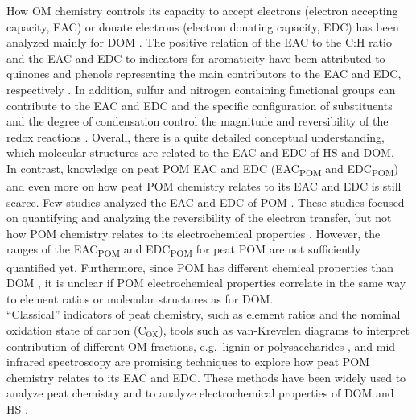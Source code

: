 \documentclass[draft,linenumbers]{agujournal2018}
\begin{document}
How OM chemistry controls its capacity to accept electrons (electron
accepting capacity, EAC) or donate electrons (electron donating
capacity, EDC) has been analyzed mainly for DOM
\citep{Ratasuk.2007, Aeschbacher.2010, Aeschbacher.2012, Fimmen.2007, HernandezMontoya.2012, Tan.2017, Walpen.2018, LaCroix.2020}.
The positive relation of the EAC to the C:H ratio and the EAC and EDC to
indicators for aromaticity have been attributed to quinones and phenols
representing the main contributors to the EAC and EDC, respectively
\citep{Aeschbacher.2010, Tan.2017}. In addition, sulfur and nitrogen
containing functional groups can contribute to the EAC and EDC
\citep{Fimmen.2007, Ratasuk.2007, HernandezMontoya.2012} and the
specific configuration of substituents and the degree of condensation
control the magnitude and reversibility of the redox reactions
\citep{Ratasuk.2007, Uchimiya.2009}. Overall, there is a quite detailed
conceptual understanding, which molecular structures are related to the
EAC and EDC of HS and DOM.\\
In contrast, knowledge on peat POM EAC and EDC (EAC\textsubscript{POM}
and EDC\textsubscript{POM}) and even more on how peat POM chemistry
relates to its EAC and EDC is still scarce. Few studies analyzed the EAC
and EDC of POM \citep{Keller.2013, Lau.2015, Lau.2016, Gao.2019}. These
studies focused on quantifying and analyzing the reversibility of the
electron transfer, but not how POM chemistry relates to its
electrochemical properties
\citep{Keller.2013, Lau.2015, Lau.2016, Gao.2019}. However, the ranges
of the EAC\textsubscript{POM} and EDC\textsubscript{POM} for peat POM
are not sufficiently quantified yet. Furthermore, since POM has
different chemical properties than DOM \citep{Worrall.2017}, it is
unclear if POM electrochemical properties correlate in the same way to
element ratios or molecular structures as for DOM.\\
``Classical'' indicators of peat chemistry, such as element ratios and
the nominal oxidation state of carbon (C\(_\text{OX}\)), tools such as
van-Krevelen diagrams to interpret contribution of different OM
fractions, e.g.~lignin or polysaccharides \citep{Kim.2003}, and mid
infrared spectroscopy are promising techniques to explore how peat POM
chemistry relates to its EAC and EDC. These methods have been widely
used to analyze peat chemistry and to analyze electrochemical properties
of DOM and HS
\citep{Worrall.2017, Leifeld.2012, Bader.2018, Moore.2018, Leifeld.2020, Cocozza.2003, Artz.2008, Hodgkins.2018, Tfaily.2014, Aeschbacher.2010, Aeschbacher.2012, Tan.2017, Lv.2018, LaCroix.2020}.
\end{document}

